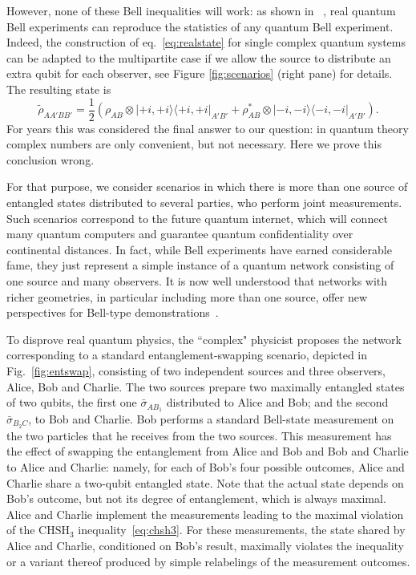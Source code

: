 \documentclass[onecolumn,prx,amsmath,amssymb,12pt]{revtex4-2}
\def\bra#1{\langle#1|} \def\ket#1{|#1\rangle}
\def\proj#1{\ket{#1}\!\bra{#1}}
\begin{document}
However, none of these Bell inequalities will work: as shown in ~\cite{tamas_real, nicolas_real, moroder}, real quantum Bell experiments can reproduce the statistics of any quantum Bell experiment. Indeed, the construction of eq.~\eqref{eq:realstate} for single complex quantum systems can be adapted to the multipartite case if we allow the source to distribute an extra qubit for each observer, see Figure \ref{fig:scenarios} (right pane) for details. The resulting state is
\begin{equation}
\label{eq:realstateAB}
\tilde \rho_{AA'BB'} = \frac{1}{2}(\rho_{AB}\otimes\proj{+i,+i}_{A'B'} + \rho_{AB}^*\otimes\proj{-i,-i}_{A'B'}) .
\end{equation}
For years this was considered the final answer to our question: in quantum theory complex numbers are only convenient, but not necessary. Here we prove this conclusion wrong. 

For that purpose, we consider scenarios in which there is more than one source of entangled states distributed to several parties, who perform joint measurements. Such scenarios correspond to the future quantum internet, which will connect many quantum computers and guarantee quantum confidentiality over continental distances. In fact, while Bell experiments have earned considerable fame, they just represent a simple instance of a quantum network consisting of one source and many observers. It is now well understood that networks with richer geometries, in particular including more than one source, offer new perspectives for Bell-type demonstrations~\cite{bilocality,tobias1,tobias2,renouBSM,bancalBSM}. 



To disprove real quantum physics, the ``complex" physicist proposes the network corresponding to a standard entanglement-swapping scenario, depicted in Fig.~\ref{fig:entswap}, consisting of two independent sources and three observers, Alice, Bob and Charlie. The two sources prepare two maximally entangled states of two qubits, the first one $\bar{\sigma}_{AB_1}$ distributed to Alice and Bob; and the second $\bar{\sigma}_{B_2C}$, to Bob and Charlie. Bob performs a standard Bell-state measurement on the two particles that he receives from the two sources. This measurement has the effect of swapping the entanglement from Alice and Bob and Bob and Charlie to Alice and Charlie: namely, for each of Bob's four possible outcomes, Alice and Charlie share a two-qubit entangled state. Note that the actual state depends on Bob's outcome, but not its degree of entanglement, which is always maximal. Alice and Charlie implement the measurements leading to the maximal violation of the $\text{CHSH}_3$ inequality~\eqref{eq:chsh3}. For these measurements, the state shared by Alice and Charlie, conditioned on Bob's result, maximally violates the inequality or a variant thereof produced by simple relabelings of the measurement outcomes.  
\end{document}
